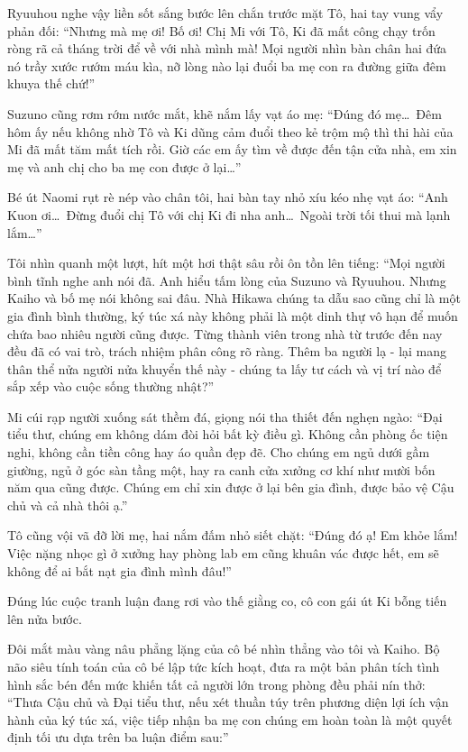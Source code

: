 \documentclass[../main.tex]{subfiles}
\begin{document}
Ryuuhou nghe vậy liền sốt sắng bước lên chắn trước mặt Tô, hai tay vung vẩy phản đối: ``Nhưng mà mẹ ơi! Bố ơi! Chị Mi với Tô, Ki đã mất công chạy trốn ròng rã cả tháng trời để về với nhà mình mà! Mọi người nhìn bàn chân hai đứa nó trầy xước rướm máu kìa, nỡ lòng nào lại đuổi ba mẹ con ra đường giữa đêm khuya thế chứ!''

Suzuno cũng rơm rớm nước mắt, khẽ nắm lấy vạt áo mẹ: ``Đúng đó mẹ\dots\ Đêm hôm ấy nếu không nhờ Tô và Ki dũng cảm đuổi theo kẻ trộm mộ thì thi hài của Mi đã mất tăm mất tích rồi. Giờ các em ấy tìm về được đến tận cửa nhà, em xin mẹ và anh chị cho ba mẹ con được ở lại\dots''

Bé út Naomi rụt rè nép vào chân tôi, hai bàn tay nhỏ xíu kéo nhẹ vạt áo: ``Anh Kuon ơi\dots\ Đừng đuổi chị Tô với chị Ki đi nha anh\dots\ Ngoài trời tối thui mà lạnh lắm\dots''

Tôi nhìn quanh một lượt, hít một hơi thật sâu rồi ôn tồn lên tiếng: ``Mọi người bình tĩnh nghe anh nói đã. Anh hiểu tấm lòng của Suzuno và Ryuuhou. Nhưng Kaiho và bố mẹ nói không sai đâu. Nhà Hikawa chúng ta dẫu sao cũng chỉ là một gia đình bình thường, ký túc xá này không phải là một dinh thự vô hạn để muốn chứa bao nhiêu người cũng được. Từng thành viên trong nhà từ trước đến nay đều đã có vai trò, trách nhiệm phân công rõ ràng. Thêm ba người lạ - lại mang thân thể nửa người nửa khuyển thế này - chúng ta lấy tư cách và vị trí nào để sắp xếp vào cuộc sống thường nhật?''

Mi cúi rạp người xuống sát thềm đá, giọng nói tha thiết đến nghẹn ngào: ``Đại tiểu thư, chúng em không dám đòi hỏi bất kỳ điều gì. Không cần phòng ốc tiện nghi, không cần tiền công hay áo quần đẹp đẽ. Cho chúng em ngủ dưới gầm giường, ngủ ở góc sàn tầng một, hay ra canh cửa xưởng cơ khí như mười bốn năm qua cũng được. Chúng em chỉ xin được ở lại bên gia đình, được bảo vệ Cậu chủ và cả nhà thôi ạ.''

Tô cũng vội vã đỡ lời mẹ, hai nắm đấm nhỏ siết chặt: ``Đúng đó ạ! Em khỏe lắm! Việc nặng nhọc gì ở xưởng hay phòng lab em cũng khuân vác được hết, em sẽ không để ai bắt nạt gia đình mình đâu!''

Đúng lúc cuộc tranh luận đang rơi vào thế giằng co, cô con gái út Ki bỗng tiến lên nửa bước.

Đôi mắt màu vàng nâu phẳng lặng của cô bé nhìn thẳng vào tôi và Kaiho. Bộ não siêu tính toán của cô bé lập tức kích hoạt, đưa ra một bản phân tích tình hình sắc bén đến mức khiến tất cả người lớn trong phòng đều phải nín thở: ``Thưa Cậu chủ và Đại tiểu thư, nếu xét thuần túy trên phương diện lợi ích vận hành của ký túc xá, việc tiếp nhận ba mẹ con chúng em hoàn toàn là một quyết định tối ưu dựa trên ba luận điểm sau:''
\end{document}
